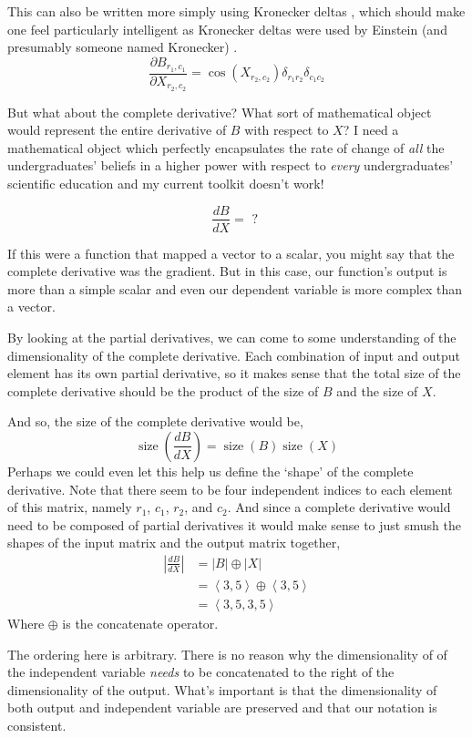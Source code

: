 \documentclass[12pt]{book}
\theoremstyle{plain}
\theoremstyle{definition}
\theoremstyle{ppart}
\theoremstyle{case}
\theoremstyle{solution}
\DeclareMathOperator{\size}{size}
\newcommand{\shape}[1]{\left|#1\right|}
\begin{document}
This can also be written more simply using Kronecker deltas \cite{wiki:kronecker},
which should make one feel particularly intelligent as Kronecker deltas were used
by Einstein (and presumably someone named Kronecker) \cite{wiki:einstein}.
\[
\frac{\partial B_{r_1,c_1}}{\partial X_{r_2,c_2}} = 
\cos (X_{r_2, c_2}) \delta_{r_1 r_2} \delta_{c_1 c_2}
\]

But what about the complete derivative?
What sort of mathematical object would represent the entire derivative
of $B$ with respect to $X$?
I need a mathematical object which perfectly
encapsulates the rate of change of \textit{all} the undergraduates' beliefs in a
higher power with respect to \textit{every} undergraduates' scientific education
and my current toolkit doesn't work!

\[\frac{dB}{dX} = \mbox{ ? }\]

If this were a function that mapped a vector to a scalar, you might say that the
complete derivative was the gradient. But in this case, our function's output is more
than a simple scalar and even our dependent variable is more complex than a vector.

By looking at the partial derivatives, we can come to some understanding of the
dimensionality of the complete derivative. Each combination of input and output
element has its own partial derivative, so it makes sense that the total size
of the complete derivative should be the product of the size of $B$ and the size
of $X$.

And so, the size of the complete derivative would be,
\[
\size\left(\frac{dB}{dX}\right) = \size(B) \size(X)
\]
Perhaps we could even let this help us define the `shape' of the complete
derivative. Note that there seem to be four independent indices to each element
of this matrix, namely $r_1$, $c_1$, $r_2$, and $c_2$.
And since a complete derivative would need to be composed of partial derivatives
it would make sense to just smush the shapes of the input matrix and the output
matrix together,
\begin{align*}
\shape{\frac{dB}{dX}} &= \shape{B} \oplus \shape{X} \\
 &= \left< 3, 5 \right> \oplus \left< 3, 5 \right> \\
 &= \left< 3, 5, 3, 5 \right>
\end{align*}
Where $\oplus$ is the concatenate operator.

The ordering here is arbitrary. There is no reason why the dimensionality of
of the independent variable \textit{needs} to be concatenated to the right of the
dimensionality of the output. What's important is that the dimensionality of
both output and independent variable are preserved and that our notation is
consistent.
\end{document}
